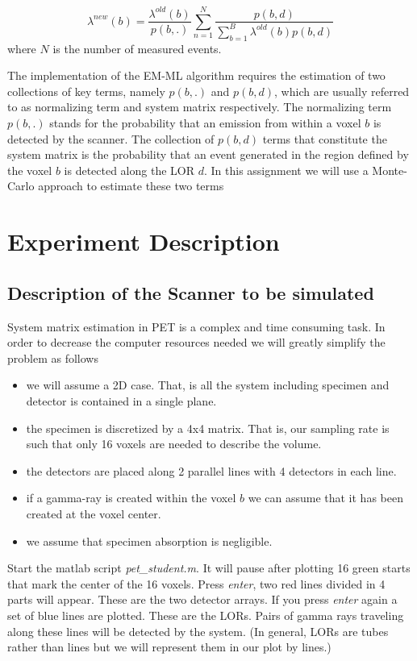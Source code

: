 \documentclass[12pt]{article} %
\begin{document}
\begin{equation}
\lambda^{new}\left(b\right)=\frac{\lambda^{old}\left(b\right)}{p(b,.)}\sum_{n=1}^{N}\frac{p(b,d)}{{\displaystyle \sum_{b=1}^{B}\lambda^{old}\left(b\right)p(b,d)}}\label{eq:2.9}\end{equation}
where $N$ is the number of measured events. 

The implementation of the EM-ML algorithm requires the estimation  of two collections
of key terms, namely $p(b,.)$ and $p(b,d)$, which
are usually referred to as normalizing term and system matrix respectively.
The normalizing term $p(b,.)$ stands for the probability that an
emission from within a voxel $b$ is detected by the scanner.
The collection of $p(b,d)$ terms that constitute the system matrix
is the probability that an event generated
in the region defined by the voxel $b$ is detected along the LOR $d$. 
In this assignment we will use a Monte-Carlo approach to estimate these two terms

\section{Experiment Description}
\subsection{Description of the Scanner to be simulated} %

System matrix estimation in PET is a complex and time consuming task. In order to
decrease the computer resources needed we will greatly simplify the problem as follows 

\begin{itemize}
    \item we will assume a 2D case. That, is all the system including specimen and detector is contained in a single plane.
    \item the specimen is discretized by a 4x4 matrix. That is, our sampling rate is such that only 16 voxels are needed to describe the volume.
    \item the detectors are placed along  2 parallel lines with 4 detectors in each line.
    \item if a gamma-ray is created within the voxel $b$ we can assume that it has been created at the 
    voxel center.
    \item we assume that specimen absorption is negligible.
\end{itemize}

Start the matlab script \emph{pet\_student.m}. It will pause after plotting 16 green starts that mark the center of the 16 voxels. Press \emph{enter}, two red lines divided in 4 parts will appear. These are the two detector arrays. If you press \emph{enter} again a set of blue lines are plotted. These are the LORs. Pairs of gamma rays traveling along these lines will be detected by the system. (In general, LORs are tubes rather than lines but we will represent them in our plot by lines.)
\end{document}
